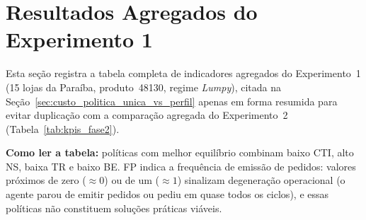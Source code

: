 \endgroup


\section{Resultados Agregados do Experimento 1}
\label{app:fase1_resultados}

Esta seção registra a tabela completa de indicadores agregados do Experimento~1 (15 lojas da Paraíba, produto~48130, regime \textit{Lumpy}), citada na Seção~\ref{sec:custo_politica_unica_vs_perfil} apenas em forma resumida para evitar duplicação com a comparação agregada do Experimento~2 (Tabela~\ref{tab:kpis_fase2}).

\noindent\textbf{Como ler a tabela:} políticas com melhor equilíbrio combinam baixo CTI, alto NS, baixa TR e baixo BE. FP indica a frequência de emissão de pedidos: valores próximos de zero ($\approx 0$) ou de um ($\approx 1$) sinalizam degeneração operacional (o agente parou de emitir pedidos ou pediu em quase todos os ciclos), e essas políticas não constituem soluções práticas viáveis.

